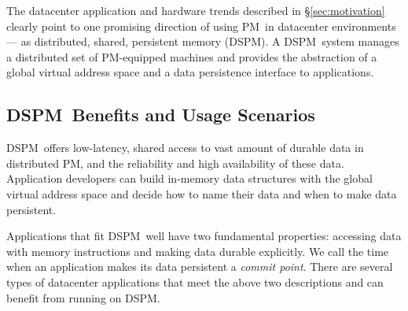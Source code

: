 \documentclass[sigconf]{acmart}
\renewcommand{\em}{\it}
\newcommand{\dsnvm}{DSPM}
\newcommand{\nvm}{PM}
\providecommand{\DIFdelbegin}{} %
\providecommand{\DIFdelend}{} %
\begin{document}
The datacenter application and hardware trends described in \S\ref{sec:motivation} 
clearly point to one promising direction of using \nvm\ in datacenter environments --- 
as distributed, shared, persistent memory (\dsnvm).
A \dsnvm\ system manages a distributed set of \nvm{}-equipped machines  
and provides the abstraction of a global virtual address space and a data persistence interface to applications.

\DIFdelbegin %
\DIFdelend \subsection{\dsnvm\ Benefits and Usage Scenarios}
\DIFdelbegin %
\DIFdelend \dsnvm\ offers low-latency, shared access to vast amount of durable data in distributed \nvm,
and the reliability and high availability of these data.
Application developers can build in-memory data structures with the global virtual address space 
and decide how to name their data and when to make data persistent.

Applications that fit \dsnvm\ well have two fundamental properties:
accessing data with memory instructions and making data durable explicitly.
We call the time when an application makes its data persistent a {\em commit point}.
There are several types of datacenter applications that meet the above two descriptions and can benefit from running on \dsnvm.
\end{document}
